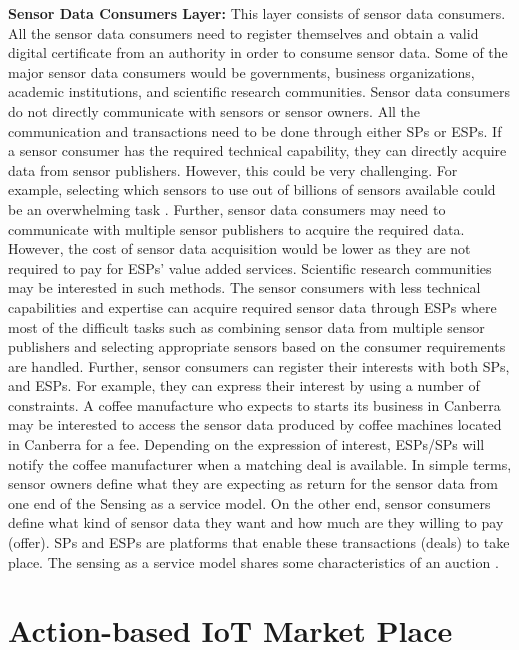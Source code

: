 \documentclass[conference]{IEEEtran}
\begin{document}
\textbf{Sensor Data Consumers Layer:} This layer consists of sensor data consumers. All the sensor data consumers need to register themselves and obtain a valid digital certificate from an authority in order to consume sensor data. Some of the major sensor data consumers would be governments, business organizations, academic institutions, and scientific research communities. Sensor data consumers do not directly communicate with sensors or sensor owners. All the communication and  transactions need to be done through either SPs or ESPs. If a sensor consumer has the required technical capability, they can directly acquire data from sensor publishers. However, this could be very challenging. For example, selecting which sensors to use out of billions of sensors available could be an overwhelming task \cite{ZMP006}. Further, sensor data consumers may need to communicate with multiple sensor publishers to acquire the required data. However, the cost of sensor data acquisition would be lower as they are not required to pay for ESPs' value added services. Scientific research communities may be interested in such methods. The sensor consumers with less technical capabilities and expertise can acquire required sensor data through ESPs where most of the difficult tasks such as combining sensor data from multiple sensor publishers and selecting appropriate sensors based on the consumer requirements are handled. Further, sensor consumers can register their interests with both SPs, and ESPs. For example, they can express their interest by using a number of constraints. A coffee manufacture who expects to starts its business in Canberra may be interested to access the sensor data produced by coffee machines located in Canberra for a fee. Depending on the expression of interest, ESPs/SPs will notify the coffee manufacturer when a matching deal is available. In simple terms, sensor owners define what they are expecting as return for the sensor data from one end of the Sensing as a service model. On the other end, sensor consumers define what kind of sensor data they want and how much are they willing to pay (offer). SPs and ESPs are platforms that enable these transactions (deals) to take place. The sensing as a service model shares some characteristics of an auction \cite{P671}.






\section{Action-based IoT Market Place}
\label{sec:The Future}
\end{document}
